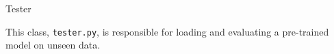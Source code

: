 \begin{section}{Tester}
    \par This class, \texttt{tester.py}, is responsible for loading and evaluating a pre-trained model on unseen data.
    
\end{section}
\clearpage